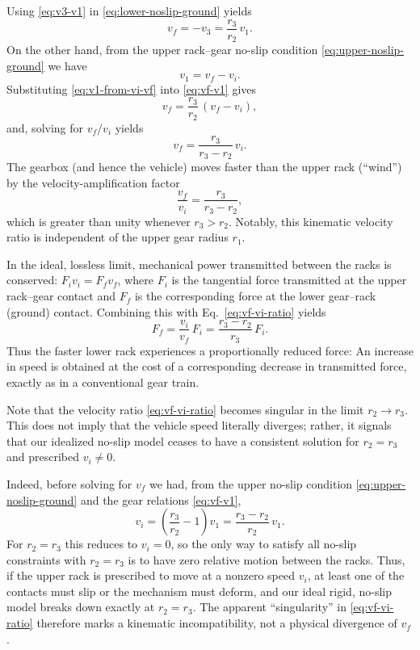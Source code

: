 \documentclass[reprint,aps,pra,longbibliography]{revtex4-2}
\begin{document}
Using \eqref{eq:v3-v1} in \eqref{eq:lower-noslip-ground} yields
\begin{equation}
v_f = -v_3 = \frac{r_3}{r_2}\,v_1.
\label{eq:vf-v1}
\end{equation}
On the other hand, from the upper rack--gear no-slip condition
\eqref{eq:upper-noslip-ground} we have
\begin{equation}
v_1 = v_f - v_i.
\label{eq:v1-from-vi-vf}
\end{equation}
Substituting \eqref{eq:v1-from-vi-vf} into \eqref{eq:vf-v1} gives
\[
v_f = \frac{r_3}{r_2}\,(v_f - v_i),
\]
and, solving for $ {v_f}/{v_i}$  yields
\begin{equation}
 v_f = \frac{r_3}{r_3 - r_2}\, {v_i}.
\label{eq:vf-vi-ratio}
\end{equation}
The gearbox (and hence the vehicle) moves faster than the upper rack
(``wind'') by the velocity-amplification factor
\begin{equation}
 \frac{v_f}{v_i} = \frac{r_3}{r_3 - r_2},
\label{eq:vaf-vf-vi-ratio}
\end{equation}
which is greater than unity whenever $r_3 > r_2$. Notably, this kinematic
velocity ratio is independent of the upper gear radius $r_1$.

In the ideal, lossless limit, mechanical power transmitted between the racks is
conserved: $F_i v_i = F_f v_f$,
where $F_i$ is the tangential force transmitted at the upper rack--gear contact
and $F_f$ is the corresponding force at the lower gear--rack (ground) contact.
Combining this with Eq.~\eqref{eq:vf-vi-ratio} yields
\begin{equation}
F_f = \frac{v_i}{v_f} \,  F_i
    = \frac{r_3 - r_2}{r_3}\, F_i.
\end{equation}
Thus the faster lower rack experiences a proportionally reduced force: An
increase in speed is obtained at the cost of a corresponding decrease in
transmitted force, exactly as in a conventional gear train.


Note that the velocity ratio \eqref{eq:vf-vi-ratio}
becomes singular in the limit $r_2 \to r_3$. This does not imply that the
vehicle speed literally diverges; rather, it signals that our idealized
no-slip model ceases to have a consistent solution for $r_2 = r_3$ and
prescribed $v_i \neq 0$.

Indeed, before solving for $v_f$ we had, from the upper no-slip condition
\eqref{eq:upper-noslip-ground} and the gear relations \eqref{eq:vf-v1},
\[
v_i = \left(\frac{r_3}{r_2} - 1\right)v_1
     = \frac{r_3 - r_2}{r_2}\,v_1.
\]
For $r_2 = r_3$ this reduces to  $v_i = 0$,
so the only way to satisfy all no-slip constraints with $r_2 = r_3$ is to
have zero relative motion between the racks. Thus, if the upper rack is
prescribed to move at a nonzero speed $v_i$, at least one of the contacts
must slip or the mechanism must deform, and our ideal rigid, no-slip model
breaks down exactly at $r_2 = r_3$. The apparent ``singularity'' in
\eqref{eq:vf-vi-ratio} therefore marks a kinematic incompatibility, not a
physical divergence of $v_f$.
\end{document}
